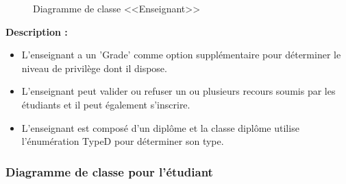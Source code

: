 \documentclass[12pt]{report}
\begin{document}
\begin{figure}[h]
\centering
    \centerline{}
    \caption{Diagramme de classe <<Enseignant>>}
\end{figure}

\vspace{0.3in}

\textbf{Description :}

\begin{itemize}
    \item L'enseignant a un 'Grade' comme option supplémentaire pour déterminer le niveau de privilège dont il dispose.
    \item L'enseignant peut valider ou refuser un ou plusieurs recours soumis par les étudiants et il peut également s'inscrire.
    \item L'enseignant est composé d'un diplôme et la classe diplôme utilise l'énumération TypeD pour déterminer son type.
\end{itemize}

\newpage

\subsubsection{Diagramme de classe pour l'étudiant}
\end{document}
